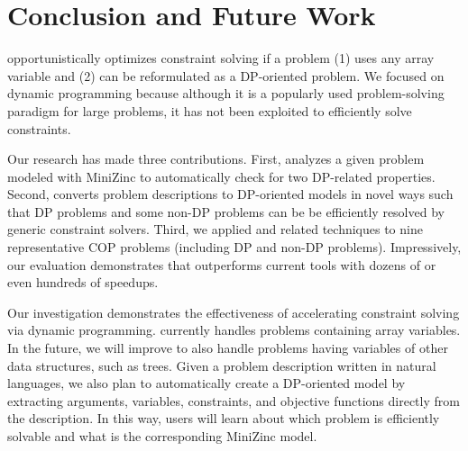 \section{Conclusion and Future Work}

\tool opportunistically optimizes constraint solving if a problem (1) uses any array variable and (2) can be reformulated as a DP-oriented problem. We focused on dynamic programming because although it is a popularly used problem-solving paradigm for large problems, it has not been exploited to efficiently solve constraints. 

Our research has made three contributions. First, \tool analyzes a given problem modeled with MiniZinc to automatically check for two DP-related properties. Second, \tool converts problem descriptions to DP-oriented models in novel ways such that DP problems and some non-DP problems can be be efficiently resolved by generic constraint solvers. 
Third, we applied \tool and related techniques to nine representative COP problems (including DP and non-DP problems). Impressively, our evaluation demonstrates that \tool outperforms current tools with dozens of or even hundreds of speedups.  

Our investigation demonstrates the effectiveness of accelerating constraint solving via dynamic programming. \tool currently handles problems containing array variables. In the future, we will improve \tool to also handle problems having variables of other data structures, such as trees. 
Given a problem description written in natural languages, we also plan to automatically create a DP-oriented model by extracting arguments, variables, constraints, and objective functions directly from the description. In this way, users will learn about which problem is efficiently solvable and what is the corresponding MiniZinc model. 


